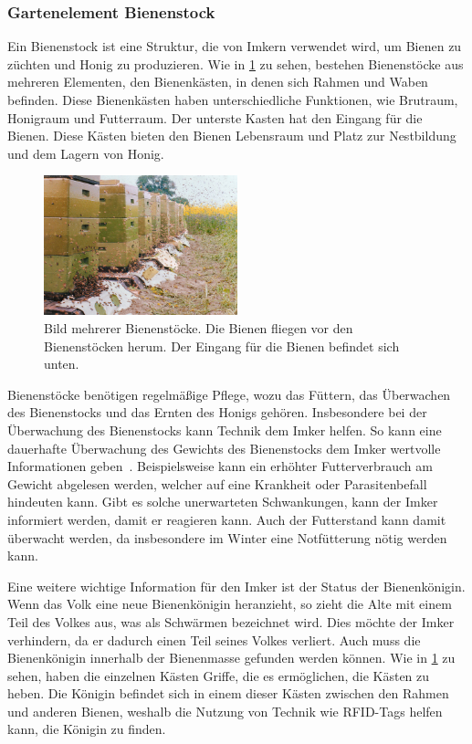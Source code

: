 \subsubsection{Gartenelement Bienenstock}
Ein Bienenstock ist eine Struktur, die von Imkern verwendet wird, um Bienen zu züchten und Honig zu produzieren.
Wie in \cref{pic:bienenstock} zu sehen, bestehen Bienenstöcke aus mehreren Elementen, den Bienenkästen, in denen sich Rahmen und Waben befinden.
Diese Bienenkästen haben unterschiedliche Funktionen, wie Brutraum, Honigraum und Futterraum.
Der unterste Kasten hat den Eingang für die Bienen.
Diese Kästen bieten den Bienen Lebensraum und Platz zur Nestbildung und dem Lagern von Honig.

\begin{figure}[!htb]
	\centering
	\includegraphics[width=0.5\textwidth]{images/Bienenstock.jpg}
	\caption[Bild mehrerer Bienenstöcke.]{
		Bild mehrerer Bienenstöcke.
		Die Bienen fliegen vor den Bienenstöcken herum.
		Der Eingang für die Bienen befindet sich unten.\footnotemark
	}
	\label{pic:bienenstock}
\end{figure}


Bienenstöcke benötigen regelmäßige Pflege, wozu das Füttern, das Überwachen des Bienenstocks und das Ernten des Honigs gehören.
Insbesondere bei der Überwachung des Bienenstocks kann Technik dem Imker helfen.
So kann eine dauerhafte Überwachung des Gewichts des Bienenstocks dem Imker wertvolle Informationen geben~\cite{BienenGewicht}.
Beispielsweise kann ein erhöhter Futterverbrauch am Gewicht abgelesen werden, welcher auf eine Krankheit oder Parasitenbefall hindeuten kann.
Gibt es solche unerwarteten Schwankungen, kann der Imker informiert werden, damit er reagieren kann.
Auch der Futterstand kann damit überwacht werden, da insbesondere im Winter eine Notfütterung nötig werden kann.

Eine weitere wichtige Information für den Imker ist der Status der Bienenkönigin.
Wenn das Volk eine neue Bienenkönigin heranzieht, so zieht die Alte mit einem Teil des Volkes aus, was als Schwärmen bezeichnet wird.
Dies möchte der Imker verhindern, da er dadurch einen Teil seines Volkes verliert.
Auch muss die Bienenkönigin innerhalb der Bienenmasse gefunden werden können.
Wie in \cref{pic:bienenstock} zu sehen, haben die einzelnen Kästen Griffe, die es ermöglichen, die Kästen zu heben.
Die Königin befindet sich in einem dieser Kästen zwischen den Rahmen und anderen Bienen, weshalb die Nutzung von Technik wie RFID-Tags helfen kann, die Königin zu finden.


